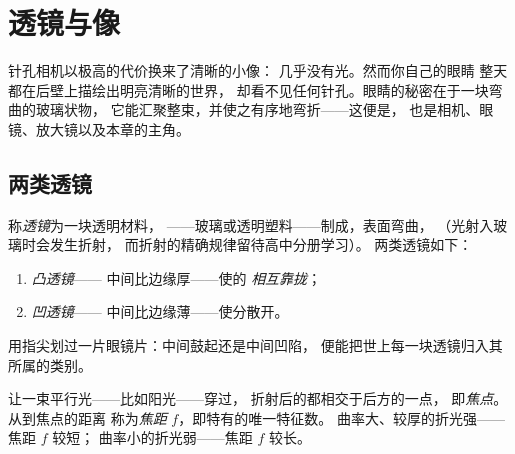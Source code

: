 \chapter{透镜与像}\label{ch:g8:lenses-images}

针孔相机以极高的代价换来了清晰的小像：
几乎没有光。然而你自己的眼睛
整天都在后壁上描绘出明亮清晰的世界，
却看不见任何针孔。眼睛的秘密在于一块弯曲的玻璃状物，
它能汇聚整束，并使之有序地弯折——这便是，
也是相机、眼镜、放大镜以及本章的主角。

\section{两类透镜}

\begin{definition}[凸透镜与凹透镜]\label{def:g8:lenses-images:families}
称\emph{透镜}为一块透明材料，
——玻璃或透明塑料——制成，表面弯曲，
（光射入玻璃时会发生折射，
而折射的精确规律留待高中分册学习）。
两类透镜如下：
\begin{enumerate}
  \item \emph{凸透镜}——
        中间比边缘厚——使的
        \emph{相互靠拢}；
  \item \emph{凹透镜}——
        中间比边缘薄——使分散开。
\end{enumerate}
用指尖划过一片眼镜片：中间鼓起还是中间凹陷，
便能把世上每一块透镜归入其所属的类别。
\end{definition}

\begin{definition}[焦点与焦距]\label{def:g8:lenses-images:focus}
让一束平行光——比如阳光——穿过，
折射后的都相交于后方的一点，
即\emph{焦点}。从到焦点的距离
称为\emph{焦距}
$f$，即特有的唯一特征数。
曲率大、较厚的折光强——焦距 $f$ 较短；
曲率小的折光弱——焦距 $f$ 较长。
\end{definition}

